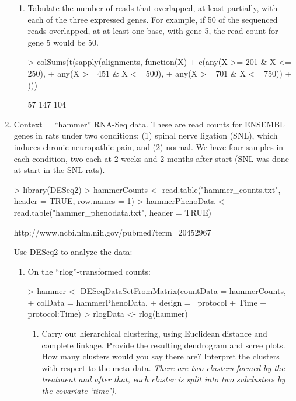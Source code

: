 \documentclass[12pt,a4paper]{paper}
\begin{document}
\begin{enumerate}
\begin{enumerate}
\item Tabulate the number of reads that overlapped, at least partially, with each of the three
expressed genes. For example, if 50 of the sequenced reads overlapped, at at least one
base, with gene 5, the read count for gene 5 would be 50.
\begin{Schunk}
\begin{Sinput}
> colSums(t(sapply(alignments, function(X){
+   c(any(X >= 201 & X <= 250),
+   any(X >= 451 & X <= 500),
+   any(X >= 701 & X <= 750))
+ })))
\end{Sinput}
\begin{Soutput}
[1]  57 147 104
\end{Soutput}
\end{Schunk}
\end{enumerate}
\item Context = “hammer” RNA-Seq data. These are read counts for ENSEMBL genes in rats
under two conditions: (1) spinal nerve ligation (SNL), which induces chronic neuropathic
pain, and (2) normal. We have four samples in each condition, two each at 2 weeks and 2
months after start (SNL was done at start in the SNL rats).
\begin{Schunk}
\begin{Sinput}
> library(DESeq2)
> hammerCounts <- read.table("hammer_counts.txt", header = TRUE, row.names = 1)
> hammerPhenoData <- read.table("hammer_phenodata.txt", header = TRUE)
\end{Sinput}
\end{Schunk}
\begin{center}
http://www.ncbi.nlm.nih.gov/pubmed?term=20452967
\end{center}
Use DESeq2 to analyze the data:
\begin{enumerate}
\item On the “rlog”-transformed counts:
\begin{Schunk}
\begin{Sinput}
> hammer <- DESeqDataSetFromMatrix(countData = hammerCounts,
+                                  colData = hammerPhenoData,
+                   design = ~protocol + Time + protocol:Time)
> rlogData <- rlog(hammer)
\end{Sinput}
\end{Schunk}
\begin{enumerate}
\item Carry out hierarchical clustering, using Euclidean distance and complete linkage.
Provide the resulting dendrogram and scree plots. How many clusters would you
say there are? Interpret the clusters with respect to the meta data. \textit{There are two clusters formed by the treatment and after that, each cluster is split into two subclusters by the covariate `time').}

\end{enumerate}
\end{enumerate}
\end{enumerate}
\end{document}
